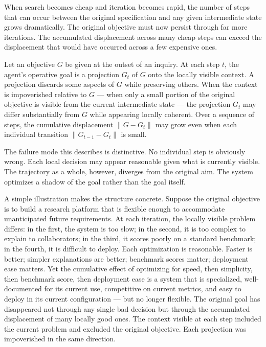 When search becomes cheap and iteration becomes rapid, the number of steps
that can occur between the original specification and any given intermediate
state grows dramatically. The original objective must now persist through far
more iterations. The accumulated displacement across many cheap steps can
exceed the displacement that would have occurred across a few expensive ones.

\begin{defn}
Let an objective $G$ be given at the outset of an inquiry. At each step $t$,
the agent's operative goal is a projection $G_t$ of $G$ onto the locally
visible context. A projection discards some aspects of $G$ while preserving
others. When the context is impoverished relative to $G$ --- when only a
small portion of the original objective is visible from the current intermediate
state --- the projection $G_t$ may differ substantially from $G$ while appearing
locally coherent. Over a sequence of steps, the cumulative displacement
$\|G - G_t\|$ may grow even when each individual transition $\|G_{t-1} - G_t\|$
is small.
\end{defn}

The failure mode this describes is distinctive. No individual step is obviously
wrong. Each local decision may appear reasonable given what is currently visible.
The trajectory as a whole, however, diverges from the original aim. The system
optimizes a shadow of the goal rather than the goal itself.

A simple illustration makes the structure concrete. Suppose the original
objective is to build a research platform that is flexible enough to accommodate
unanticipated future requirements. At each iteration, the locally visible
problem differs: in the first, the system is too slow; in the second, it is
too complex to explain to collaborators; in the third, it scores poorly on
a standard benchmark; in the fourth, it is difficult to deploy. Each optimization
is reasonable. Faster is better; simpler explanations are better; benchmark
scores matter; deployment ease matters. Yet the cumulative effect of optimizing
for speed, then simplicity, then benchmark score, then deployment ease is a
system that is specialized, well-documented for its current use, competitive
on current metrics, and easy to deploy in its current configuration --- but
no longer flexible. The original goal has disappeared not through any single
bad decision but through the accumulated displacement of many locally good ones.
The context visible at each step included the current problem and excluded the
original objective. Each projection was impoverished in the same direction.

